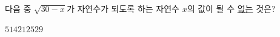 다음 중 $\sqrt{30-x}$가 자연수가 되도록 하는 자연수 $x$의 값이 될 수 \underline{없는} 것은?
\begin{choices32}{$5$}{$14$}{$21$}{$25$}{$29$}\end{choices32}
